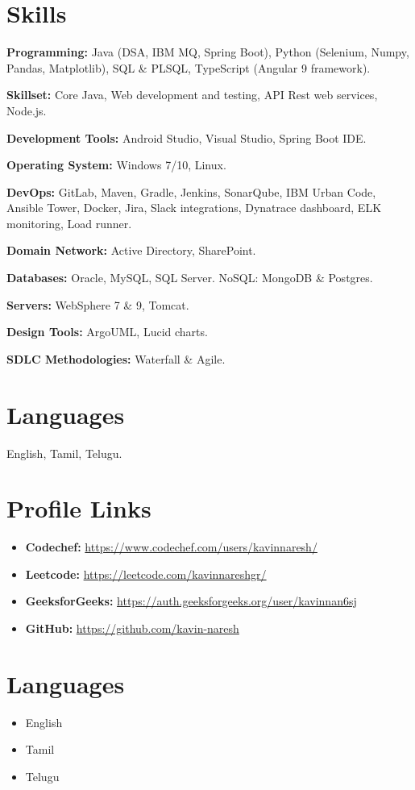 \documentclass[letterpaper,10pt]{article}
\begin{document}
\section*{Skills}

\textbf{Programming:} Java (DSA, IBM MQ, Spring Boot), Python (Selenium, Numpy, Pandas, Matplotlib), SQL \& PLSQL, TypeScript (Angular 9 framework).

\textbf{Skillset:} Core Java, Web development and testing, API Rest web services, Node.js.

\textbf{Development Tools:} Android Studio, Visual Studio, Spring Boot IDE.

\textbf{Operating System:} Windows 7/10, Linux.

\textbf{DevOps:} GitLab, Maven, Gradle, Jenkins, SonarQube, IBM Urban Code, Ansible Tower, Docker, Jira, Slack integrations, Dynatrace dashboard, ELK monitoring, Load runner.

\textbf{Domain Network:} Active Directory, SharePoint.

\textbf{Databases:} Oracle, MySQL, SQL Server. NoSQL: MongoDB \& Postgres.

\textbf{Servers:} WebSphere 7 \& 9, Tomcat.

\textbf{Design Tools:} ArgoUML, Lucid charts.

\textbf{SDLC Methodologies:} Waterfall \& Agile.

\section*{Languages}

English, Tamil, Telugu.

\newpage

\section*{Profile Links}

\begin{itemize}[left=0pt, label={}]
    \item \textbf{Codechef:} \href{https://www.codechef.com/users/kavinnaresh/}{https://www.codechef.com/users/kavinnaresh/}
    \item \textbf{Leetcode:} \href{https://leetcode.com/kavinnareshgr/}{https://leetcode.com/kavinnareshgr/}
    \item \textbf{GeeksforGeeks:} \href{https://auth.geeksforgeeks.org/user/kavinnan6sj}{https://auth.geeksforgeeks.org/user/kavinnan6sj}
    \item \textbf{GitHub:} \href{https://github.com/kavin-naresh}{https://github.com/kavin-naresh}
\end{itemize}

\section*{Languages}

\begin{itemize}
    \item English
    \item Tamil
    \item Telugu
\end{itemize}
\end{document}
